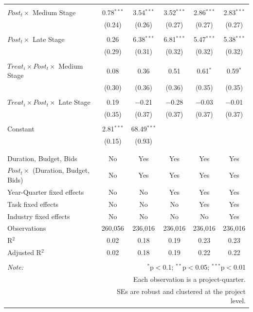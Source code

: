 \documentclass[
]{article}
\begin{document}
\begin{table}[H]
\begin{tabular}{@{\extracolsep{-2pt}}lccccc}
  & & & & & \\ 
 $Post_t \times$ Medium Stage & 0.78$^{***}$ & 3.54$^{***}$ & 3.52$^{***}$ & 2.86$^{***}$ & 2.83$^{***}$ \\ 
  & (0.24) & (0.26) & (0.27) & (0.27) & (0.27) \\ 
  & & & & & \\ 
 $Post_t \times$ Late Stage & 0.26 & 6.38$^{***}$ & 6.81$^{***}$ & 5.47$^{***}$ & 5.38$^{***}$ \\ 
  & (0.29) & (0.31) & (0.32) & (0.32) & (0.32) \\ 
  & & & & & \\ 
 $Treat_i \times Post_t \times$ Medium Stage & 0.08 & 0.36 & 0.51 & 0.61$^{*}$ & 0.59$^{*}$ \\ 
  & (0.30) & (0.36) & (0.36) & (0.35) & (0.35) \\ 
  & & & & & \\ 
 $Treat_i \times Post_t \times$ Late Stage & 0.19 & $-$0.21 & $-$0.28 & $-$0.03 & $-$0.01 \\ 
  & (0.35) & (0.37) & (0.37) & (0.37) & (0.37) \\ 
  & & & & & \\ 
 Constant & 2.81$^{***}$ & 68.49$^{***}$ &  &  &  \\ 
  & (0.15) & (0.93) &  &  &  \\ 
  & & & & & \\ 
\hline \\[-1.8ex] 
Duration, Budget, Bids & No & Yes & Yes & Yes & Yes \\ 
$Post_t \times $  (Duration, Budget, Bids) & No & Yes & Yes & Yes & Yes \\ 
Year-Quarter fixed effects & No & No & Yes & Yes & Yes \\ 
Task fixed effects & No & No & No & Yes & Yes \\ 
Industry fixed effects & No & No & No & No & Yes \\ 
Observations & 260,056 & 236,016 & 236,016 & 236,016 & 236,016 \\ 
R$^{2}$ & 0.02 & 0.18 & 0.19 & 0.23 & 0.23 \\ 
Adjusted R$^{2}$ & 0.02 & 0.18 & 0.19 & 0.22 & 0.22 \\ 
\hline 
\hline \\[-1.8ex] 
\textit{Note:}  & \multicolumn{5}{r}{$^{*}$p$<$0.1; $^{**}$p$<$0.05; $^{***}$p$<$0.01} \\ 
 & \multicolumn{5}{r}{Each observation is a project-quarter.} \\ 
 & \multicolumn{5}{r}{SEs are robust and clustered at the project level.} \\ 
\end{tabular} 
\end{table}
\end{document}
